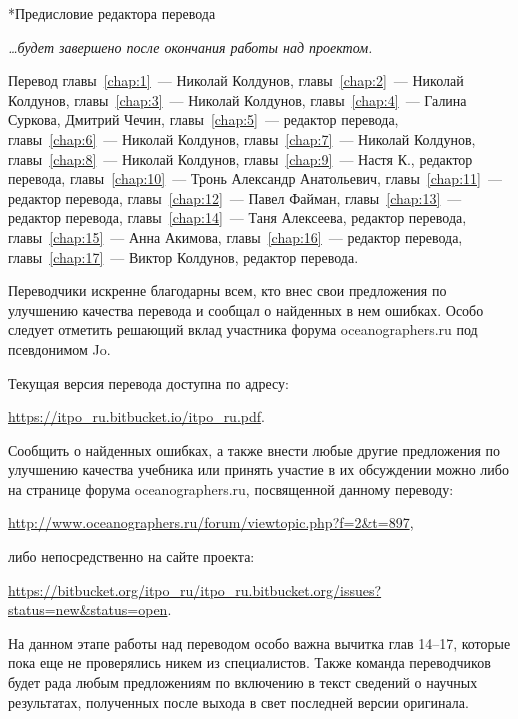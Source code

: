 
\begin{chapter}*{Предисловие редактора перевода}

\textit{\dots{}будет завершено после окончания работы над проектом.}

\bigskip 

Перевод главы~\ref{chap:1}~--- Николай Колдунов, 
главы~\ref{chap:2}~--- Николай Колдунов,
главы~\ref{chap:3}~--- Николай Колдунов, 
главы~\ref{chap:4}~--- Галина Суркова, Дмитрий Чечин, 
главы~\ref{chap:5}~--- редактор перевода, 
главы~\ref{chap:6}~--- Николай Колдунов, 
главы~\ref{chap:7}~--- Николай Колдунов,
главы~\ref{chap:8}~--- Николай Колдунов,
главы~\ref{chap:9}~--- Настя К., редактор перевода,
главы~\ref{chap:10}~--- Тронь Александр Анатольевич,
главы~\ref{chap:11}~--- редактор перевода,
главы~\ref{chap:12}~--- Павел Файман,
главы~\ref{chap:13}~--- редактор перевода,
главы~\ref{chap:14}~--- Таня Алексеева, редактор перевода,
главы~\ref{chap:15}~--- Анна Акимова,
главы~\ref{chap:16}~--- редактор перевода,
главы~\ref{chap:17}~--- Виктор Колдунов, редактор перевода.

Переводчики искренне благодарны всем, кто внес свои предложения по
улучшению качества перевода и сообщал о найденных в нем ошибках. Особо
следует отметить решающий вклад участника форума oceanographers.ru под
псевдонимом Jo.

Текущая версия перевода доступна по адресу:
\begin{center}
\href{https://itpo_ru.bitbucket.io/itpo_ru.pdf}%
{\url{https://itpo_ru.bitbucket.io/itpo_ru.pdf}}. 
\end{center}

Сообщить о найденных ошибках, а также внести любые другие предложения
по улучшению качества учебника или принять участие в их обсуждении
можно либо на странице форума oceanographers.ru, посвященной данному
переводу:
\begin{center}
 \href{http://www.oceanographers.ru/forum/viewtopic.php?f=2&t=897}%
{\url{http://www.oceanographers.ru/forum/viewtopic.php?f=2&t=897}},
\end{center}
либо непосредственно на сайте проекта:
\begin{center}
\href{https://bitbucket.org/itpo_ru/itpo_ru.bitbucket.org/issues?status=new&status=open}%
{\url{https://bitbucket.org/itpo_ru/itpo_ru.bitbucket.org/issues?status=new&status=open}}.
\end{center}

На данном этапе работы над переводом особо важна вычитка глав 14--17,
которые пока еще не проверялись никем из специалистов. Также команда
переводчиков будет рада любым предложениям по включению в текст
сведений о научных результатах, полученных после выхода в свет
последней версии оригинала.
\end{chapter}
